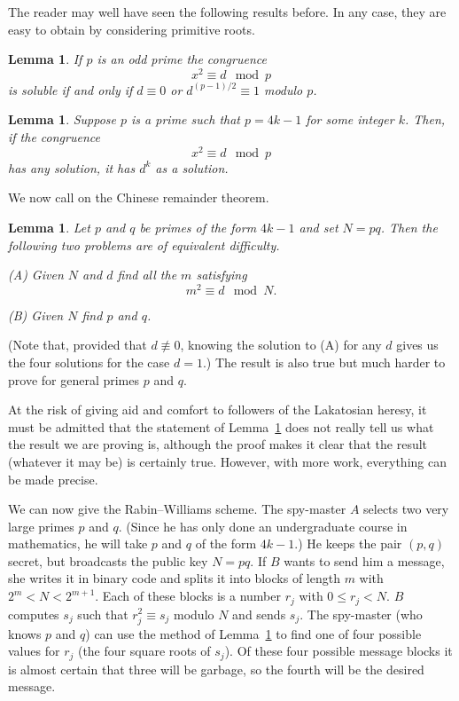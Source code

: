 \documentclass[12pt,a4paper]{article}
\theoremstyle{plain}
\newtheorem{lemma}[theorem]{Lemma}
\theoremstyle{definition}
\begin{document}
The reader may well have seen the following results 
before.
In any case, they are
easy to obtain by considering primitive
roots.
\begin{lemma} If $p$ is an odd prime the congruence
\[x^{2}\equiv d\mod{p}\]
is soluble if and only if $d\equiv 0$ or
$d^{(p-1)/2}\equiv 1$ modulo $p$.
\end{lemma}
\begin{lemma} Suppose $p$ is a prime such that
$p=4k-1$ for some integer $k$. Then, if the congruence
\[x^{2}\equiv d\mod{p}\]
has any solution, it has $d^{k}$ as a solution.
\end{lemma}
We now call on the Chinese remainder theorem.
\begin{lemma}\label{square root}
Let $p$ and $q$ be primes of the
form $4k-1$ and set $N=pq$.
Then the following two problems are of equivalent
difficulty.

(A) Given $N$ and $d$ find all the $m$ satisfying
\[m^{2}\equiv d\mod{N}.\]

(B) Given $N$ find $p$ and $q$.
\end{lemma}
\noindent
(Note that, provided that $d\not\equiv 0$,
knowing the solution to (A) for any $d$
gives us the four solutions for the case $d=1$.)
The result is also true but much harder
to prove for general primes $p$ and $q$.



At the risk of giving aid and comfort
to followers of the
Lakatosian heresy, it must be admitted  that
the statement of Lemma~\ref{square root}
does not really tell us what the result
we are proving is,
although the proof makes it  clear
that the result (whatever it may be) is certainly
true. However, with more work, everything can be
made precise.

We can now give the Rabin--Williams scheme.
The spy-master $A$ selects two very large
primes $p$ and $q$. (Since he has only done
an undergraduate course in mathematics,
he will take $p$ and $q$ of the form $4k-1$.)
He keeps the pair $(p,q)$ secret, but broadcasts
the public key $N=pq$. If $B$ wants to
send him a message, she writes it in binary code and
splits it into blocks of length $m$ with
$2^{m}<N<2^{m+1}$. Each of these blocks
is a number $r_{j}$ with $0\leq r_{j}<N$.
$B$ computes $s_{j}$ such that $r_{j}^{2}\equiv s_{j}$
modulo $N$ and sends $s_{j}$. The spy-master
(who knows $p$ and $q$) can use the
method of Lemma~\ref{square root} to find
one of four possible values for $r_{j}$
(the four square roots of $s_{j}$).
Of these four possible message blocks
it is almost
certain that three will be garbage, so
the fourth will be the desired message.
\end{document}
